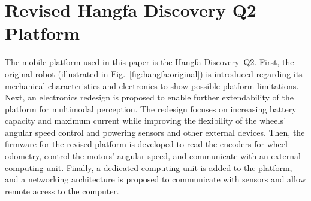 \documentclass[letterpaper,10pt,conference]{IEEEtran} %
\def\figref#1{Fig.~\ref{#1}}
\def\eqref#1{Equation~(\ref{#1})}
\begin{document}






\section{Revised Hangfa Discovery Q2 Platform}\label{sec:hangfa}

The mobile platform used in this paper is the Hangfa Discovery~Q2.
First, the original robot (illustrated in \figref{fig:hangfa:original})
is introduced regarding its mechanical characteristics and electronics
to show possible platform limitations. Next, an electronics redesign
is proposed to enable further extendability of the platform
for multimodal perception. The redesign focuses on increasing
battery capacity and maximum current while improving the flexibility of
the wheels' angular speed control and powering sensors and
other external devices. Then, the firmware for the revised platform
is developed to read the encoders for wheel odometry,
control the motors' angular speed, and communicate with
an external computing unit. Finally, a dedicated computing unit
is added to the platform, and a networking architecture is proposed
to communicate with sensors and allow remote access to the computer.
\end{document}
